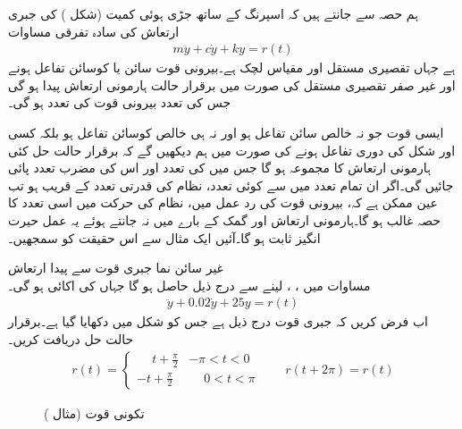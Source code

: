 ہم حصہ  سے جانتے ہیں کہ اسپرنگ کے ساتھ جڑی  ہوئی کمیت  (شکل ) کی جبری ارتعاش کی سادہ تفرقی مساوات
\begin{align}\label{مساوات_فوریئر_جبری_ارتعاش_الف}
m\ddot{y}+c\dot{y}+ky=r(t)
\end{align}
ہے جہاں  تقصیری مستقل اور  مقیاس لچک ہے۔بیرونی قوت سائن یا کوسائن تفاعل ہونے اور غیر صفر تقصیری مستقل کی صورت میں برقرار حالت ہارمونی ارتعاش پیدا ہو گی  جس کی تعدد بیرونی قوت کی تعدد ہو گی۔   

ایسی قوت  جو نہ خالص سائن تفاعل ہو اور نہ ہی خالص کوسائن تفاعل ہو بلکہ کسی اور شکل کی دوری تفاعل ہونے کی صورت میں ہم دیکھیں گے کہ برقرار حالت حل کئی ہارمونی ارتعاش کا مجموعہ ہو گا جس میں  کی تعدد اور اس کی مضرب تعدد  پائی جائیں گی۔اگر ان تمام تعدد میں سے کوئی تعدد، نظام کی قدرتی تعدد کے قریب ہو تب عین ممکن ہے کہ،  بیرونی قوت کی رد عمل میں، نظام کی حرکت میں اسی تعدد کا حصہ غالب ہو گا۔ہارمونی ارتعاش اور گمک کے بارے میں نہ جانتے ہوئے یہ عمل حیرت انگیز ثابت ہو گا۔آئیں ایک مثال سے اس حقیقت کو سمجھیں۔

\quad غیر سائن نما جبری قوت سے پیدا ارتعاش\\
مساوات  میں ، ،  لینے سے درج ذیل حاصل ہو گا جہاں  کی اکائی  ہو گی۔
\begin{align}\label{مساوات_فوریئر_جبری_ارتعاش_مثال_الف}
\ddot{y}+0.02\dot{y}+25y=r(t)
\end{align}
اب فرض کریں کہ جبری قوت  درج ذیل ہے جس کو شکل  میں دکھایا گیا ہے۔برقرار حالت حل دریافت کریں۔
\begin{align*}
r(t)=
\begin{cases}
\phantom{-}t+\frac{\pi}{2}& -\pi<t<0\\
-t+\frac{\pi}{2}&\phantom{-}0<t<\pi
\end{cases}
\quad\quad  r(t+2\pi)=r(t)
\end{align*}
%
\begin{figure}
\centering
{}
\caption{تکونی قوت (مثال )}
\label{شکل_مثال_فوریئر_جبری_ارتعاش}
\end{figure}

